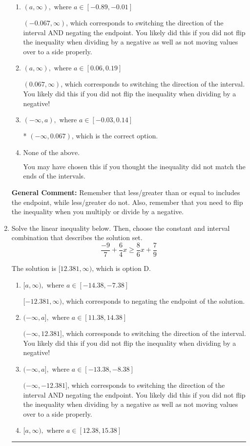 \documentclass{extbook}[14pt]
\newcommand{\litem}[1]{\item #1

\rule{\textwidth}{0.4pt}}
\begin{document}
\begin{enumerate}
{\begin{enumerate}[label=\Alph*.]
 $(-\infty, -0.067)$, which corresponds to negating the endpoint of the solution.
\item \( (a, \infty), \text{ where } a \in [-0.89, -0.01] \)

 $(-0.067, \infty)$, which corresponds to switching the direction of the interval AND negating the endpoint. You likely did this if you did not flip the inequality when dividing by a negative as well as not moving values over to a side properly.
\item \( (a, \infty), \text{ where } a \in [0.06, 0.19] \)

 $(0.067, \infty)$, which corresponds to switching the direction of the interval. You likely did this if you did not flip the inequality when dividing by a negative!
\item \( (-\infty, a), \text{ where } a \in [-0.03, 0.14] \)

* $(-\infty, 0.067)$, which is the correct option.
\item \( \text{None of the above}. \)

You may have chosen this if you thought the inequality did not match the ends of the intervals.
\end{enumerate}

\textbf{General Comment:} Remember that less/greater than or equal to includes the endpoint, while less/greater do not. Also, remember that you need to flip the inequality when you multiply or divide by a negative.
}
\litem{
Solve the linear inequality below. Then, choose the constant and interval combination that describes the solution set.
\[ \frac{-9}{7} + \frac{6}{4} x \geq \frac{8}{6} x + \frac{7}{9} \]

The solution is \( [12.381, \infty) \), which is option D.\begin{enumerate}[label=\Alph*.]
\item \( [a, \infty), \text{ where } a \in [-14.38, -7.38] \)

 $[-12.381, \infty)$, which corresponds to negating the endpoint of the solution.
\item \( (-\infty, a], \text{ where } a \in [11.38, 14.38] \)

 $(-\infty, 12.381]$, which corresponds to switching the direction of the interval. You likely did this if you did not flip the inequality when dividing by a negative!
\item \( (-\infty, a], \text{ where } a \in [-13.38, -8.38] \)

 $(-\infty, -12.381]$, which corresponds to switching the direction of the interval AND negating the endpoint. You likely did this if you did not flip the inequality when dividing by a negative as well as not moving values over to a side properly.
\item \( [a, \infty), \text{ where } a \in [12.38, 15.38] \)


\end{enumerate}}
\end{enumerate}
\end{document}
